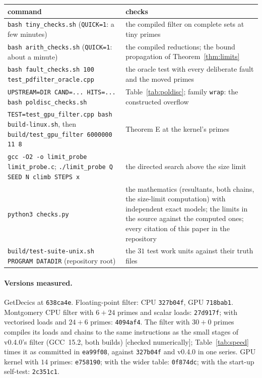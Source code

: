 \documentclass[10pt,a4paper]{article}
\newcommand{\code}[1]{\texttt{#1}}
\newcommand{\stnum}{\textsf{\small[checked numerically]}\xspace}
\theoremstyle{plain}
\theoremstyle{definition}
\begin{document}
\begin{center}\footnotesize
\begin{tabularx}{\textwidth}{@{}>{\raggedright\arraybackslash}p{}X@{}}
\toprule
command & checks \\ \midrule
\code{bash tiny\_checks.sh} (\code{QUICK=1}: a few minutes) & the compiled filter on complete sets at tiny primes \\
\code{bash arith\_checks.sh} (\code{QUICK=1}: about a minute) & the compiled reductions; the bound propagation of Theorem~\ref{thm:limits} \\
\code{bash fault\_checks.sh 100 test\_pdfilter\_oracle.cpp} & the oracle test with every deliberate fault and the moved primes \\
\code{UPSTREAM=DIR CAND=... HITS=... bash poldisc\_checks.sh} & Table~\ref{tab:poldisc}; family \code{wrap}: the constructed overflow \\
\code{TEST=test\_gpu\_filter.cpp bash build-linux.sh}, then \code{build/test\_gpu\_filter 6000000 11 8} & Theorem E at the kernel's primes \\
\code{gcc -O2 -o limit\_probe limit\_probe.c}; \code{./limit\_probe Q SEED N climb STEPS x} & the directed search above the size limit \\
\code{python3 checks.py} & the mathematics (resultants, both chains, the size-limit computation) with independent exact models; the limits in the source
against the computed ones; every citation of this paper in the repository \\
\code{build/test-suite-unix.sh PROGRAM DATADIR} (repository root) & the $31$ test work units against their truth files \\
\bottomrule
\end{tabularx}
\end{center}

\paragraph{Versions measured.}  GetDecics at \code{638ca4e}.  Floating-point filter: CPU \code{327b04f}, GPU \code{718bab1}.  Montgomery CPU filter with $6+24$ primes
and scalar loads: \code{27d917f}; with vectorised loads and $24+6$ primes: \code{4094af4}.  The filter with $30+0$ primes compiles its loads and chains to the
same instructions as the small stages of v0.4.0's filter (GCC~15.2, both builds) \stnum; Table~\ref{tab:speed} times it as committed in \code{ea99f08}, against
\code{327b04f} and v0.4.0 in one series.  GPU kernel with $14$ primes: \code{e758190}; with the wider table:
\code{0f874dc}; with the start-up self-test: \code{2c351c1}.
\end{document}

